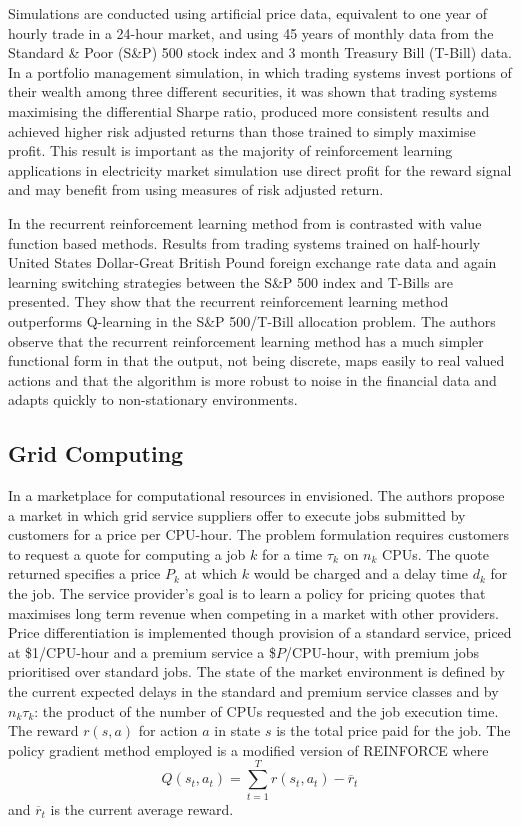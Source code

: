 Simulations are conducted using artificial price data, equivalent to one year of
hourly trade in a 24-hour market, and using 45 years of monthly data from the
Standard \& Poor (S\&P) 500 stock index and 3 month Treasury Bill (T-Bill) data.
In a portfolio management simulation, in which trading systems invest portions
of their wealth among three different securities, it was shown that trading
systems maximising the differential Sharpe ratio, produced more consistent
results and achieved higher risk adjusted returns than those trained to simply
maximise profit.  This result is important as the majority of reinforcement
learning applications in electricity market simulation use direct profit for the
reward signal and may benefit from using measures of risk adjusted return.

In  the recurrent reinforcement learning method from
 is contrasted with value function based methods.  Results from
trading systems trained on half-hourly United States Dollar-Great British Pound
foreign exchange rate data and again learning switching strategies between the
S\&P 500 index and T-Bills are presented.  They show that the recurrent
reinforcement learning method outperforms Q-learning in the S\&P 500/T-Bill
allocation problem.  The authors observe that the recurrent reinforcement
learning method has a much simpler functional form in that the output, not being
discrete, maps easily to real valued actions and that the algorithm is more
robust to noise in the financial data and adapts quickly to non-stationary
environments.

\subsection{Grid Computing}
In  a marketplace for computational resources in
envisioned.  The authors propose a market in which grid service suppliers offer
to execute jobs submitted by customers for a price per CPU-hour.  The problem
formulation requires customers to request a quote for computing a job $k$ for a
time $\tau_k$ on $n_k$ CPUs.  The quote returned specifies a price $P_k$ at
which $k$ would be charged and a delay time $d_k$ for the job.  The service
provider's goal is to learn a policy for pricing quotes that maximises long term
revenue when competing in a market with other providers.  Price differentiation
is implemented though provision of a standard service, priced at \$1/CPU-hour
and a premium service a \$$P$/CPU-hour, with premium jobs prioritised over
standard jobs.  The state of the market environment is defined by the current
expected delays in the standard and premium service classes and by $n_k \tau_k$:
the product of the number of CPUs requested and the job execution time.  The
reward $r(s,a)$ for action $a$ in state $s$ is the total price paid for the job.
 The policy gradient method employed is a modified version of REINFORCE
\cite{williams:reinforce} where
\begin{equation}
Q(s_t,a_t) = \sum_{t=1}^T r(s_t,a_t) - \overline{r}_t
\end{equation}
and $\overline{r}_t$ is the current average reward.

